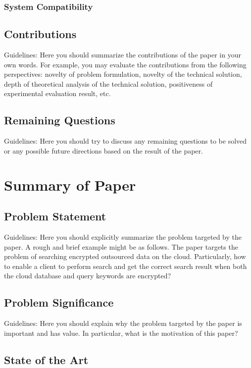 \documentclass[conference]{IEEEtran}
\begin{document}
\subsubsection{System Compatibility}


\subsection{Contributions}
Guidelines: Here you should summarize the contributions of the paper in your own words.
%
For example, you may evaluate the contributions from the following perspectives: novelty of problem formulation, novelty of the technical solution, depth of theoretical analysis of the technical solution, positiveness of experimental evaluation result, etc.

\subsection{Remaining Questions}
Guidelines: Here you should try to discuss any remaining questions to be solved or any possible future directions based on the result of the paper.

\section{Summary of Paper\cite{bonneau2015sok}}

\subsection{Problem Statement}
Guidelines: Here you should explicitly summarize the problem targeted by the paper. A rough and brief example might be as follows.
%
The paper targets the problem of searching encrypted outsourced data on the cloud.
%
Particularly, how to enable a client to perform search and get the correct search result when both the cloud database and query keywords are encrypted?

\subsection{Problem Significance}
Guidelines: Here you should explain why the problem targeted by the paper is important and has value.
%
In particular, what is the motivation of this paper?


\subsection{State of the Art}
\end{document}
